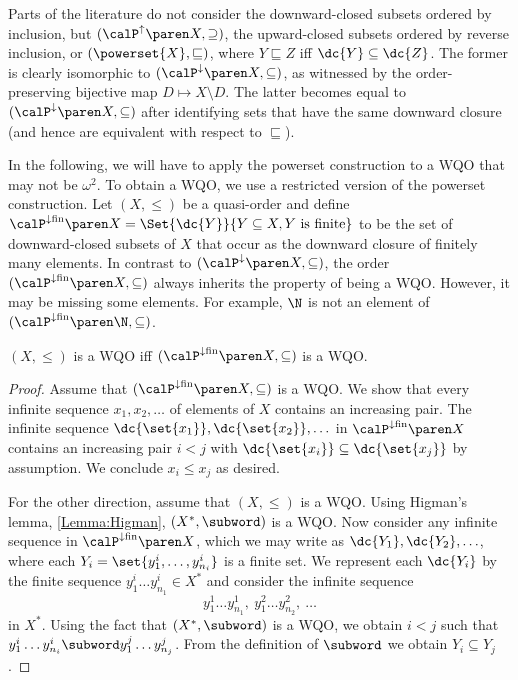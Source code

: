 \documentclass[../../diss.tex]{subfiles}
\begin{document}
Parts of the literature do not consider the downward-closed subsets ordered by inclusion, but $(\pwrsetup{X},\supseteq)$, the upward-closed subsets ordered by reverse inclusion, or $(\powerset{X},\sqsubseteq)$, where $Y \sqsubseteq Z$ iff $\dc{Y} \subseteq \dc{Z}$.
The former is clearly isomorphic to $(\pwrsetdown{X},\subseteq)$, as witnessed by the order-preserving bijective map $D \mapsto X \setminus D$.
The latter becomes equal to $(\pwrsetdown{X},\subseteq)$ after identifying sets that have the same downward closure (and hence are equivalent with respect to $\sqsubseteq$).


In the following, we will have to apply the powerset construction to a WQO that may not be $\omega^2$.
To obtain a WQO, we use a restricted version of the powerset construction.
Let $(X,\leq)$ be a quasi-order and define $\pwrsetdownfin{X} = \Set{ \dc{Y} }{ Y \subseteq X, Y \text{ is finite}}$ to be the set of downward-closed subsets of $X$ that occur as the downward closure of finitely many elements.
In contrast to $(\pwrsetdown{X},\subseteq)$, the order $(\pwrsetdownfin{X},\subseteq)$ always inherits the property of being a WQO.\@
However, it may be missing some elements.
For example, $\N$ is not an element of $(\pwrsetdownfin{\N},\subseteq)$.

\begin{lemma}%
\label{Lemma:WSTSPwrsetdownfin}%
    $(X,\leq)$ is a WQO iff $(\pwrsetdownfin{X},\subseteq)$ is a WQO.\@
\end{lemma}

\begin{proof}
    Assume that  $(\pwrsetdownfin{X}, {\subseteq})$ is a WQO.\@
    We show that every infinite sequence $x_1, x_2, \dots$ of elements of $X$ contains an increasing pair.
    The infinite sequence
    $\dc{\set{x_1}}, \dc{\set{x_2}},\ldots $
    in $\pwrsetdownfin{X}$ contains an increasing pair $i < j$ with $\dc{\set{x_i}} \subseteq \dc{\set{x_j}}$ by assumption.
    We conclude $x_i \leq x_j$ as desired.

    For the other direction, assume that $(X, \leq)$ is a WQO.\@
    Using Higman's lemma, \cref{Lemma:Higman}, $(X^*,\subword)$ is a WQO.\@
    Now consider any infinite sequence in $\pwrsetdownfin{X}$, which we may write as $\dc{Y_1},\dc{Y_2},\ldots$, where each
    $Y_i = \set{ y^i_1, \ldots ,y^i_{n_i} }$ is a finite set.
    We represent each $\dc{Y_i}$ by the finite sequence $y^i_1 \ldots y^i_{n_1} \in X^*$ and consider the infinite sequence
    \[
        y^1_1 \dots y^1_{n_1}, \ y^2_1 \dots y^2_{n_2}, \ \ldots
    \]
    in $X^*$.
    Using the fact that $(X^*,\subword)$ is a WQO, we obtain $i < j$ such that
    $y^i_1 \dots y^i_{n_i} \subword y^j_1 \dots y^j_{n_j}$.
    From the definition of $\subword$ we obtain $Y_i \subseteq Y_j$.
\end{proof}
\end{document}
